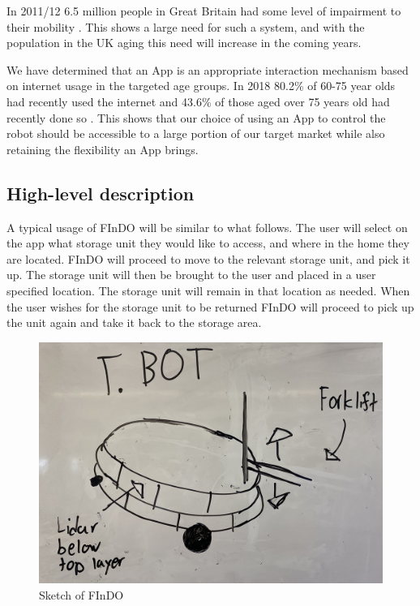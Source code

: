 \documentclass{article}
\begin{document}
In 2011/12 6.5 million people in Great Britain had some level of impairment to their mobility \cite{disabilitystats}. This shows a large need for such a system, and with the population in the UK aging \cite{agegrowth} this need will increase in the coming years.

We have determined that an App is an appropriate interaction mechanism based on internet usage in the targeted age groups. In 2018 80.2\% of 60-75 year olds had recently used the internet and 43.6\% of those aged over 75 years old had recently done so \cite{webage}. This shows that our choice of using an App to control the robot should be accessible to a large portion of our target market while also retaining the flexibility an App brings.

\subsection{High-level description} 
A typical usage of FInDO will be similar to what follows. The user will select on the app what storage unit they would like to access, and where in the home they are located. 
FInDO will proceed to move to the relevant storage unit, and pick it up. 
The storage unit will then be  brought to the user and placed in a user specified location. The storage unit will remain in that location as needed. When the user wishes for the storage unit to be returned FInDO will proceed to pick up the unit again and take it back to the  storage area.

\begin{figure}[tb]
\vskip 3mm
\begin{center}
\begin{small}
\begin{sc}
\centerline{\includegraphics[width=0.5\columnwidth]{figs/tbot.jpeg}}
\caption{Sketch of FInDO}
\label{Front view}
\end{sc}
\end{small}
\end{center}
\vskip -3mm
\end{figure} 
\end{document}
